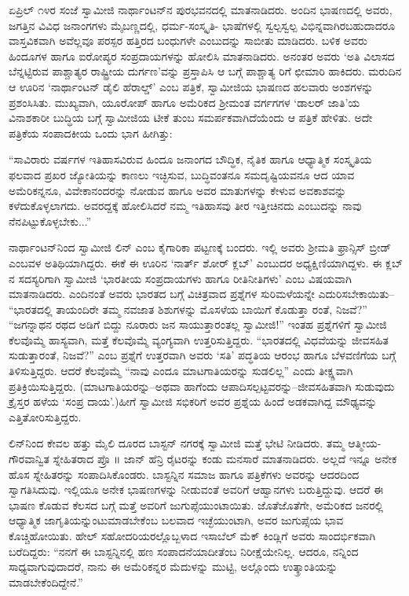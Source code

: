ಏಪ್ರಿಲ್ ೧೪ರ ಸಂಜೆ ಸ್ವಾಮೀಜಿ ನಾರ್ಥಾಂಟನ್​ನ ಪುರಭವನದಲ್ಲಿ ಮಾತನಾಡಿದರು. ಅಂದಿನ ಭಾಷಣದಲ್ಲಿ ಅವರು, ಜಗತ್ತಿನ ವಿವಿಧ ಜನಾಂಗಗಳು ಮೈಬಣ್ಣದಲ್ಲಿ, ಧರ್ಮ-ಸಂಸ್ಕೃತಿ- ಭಾಷೆಗಳಲ್ಲಿ ಸ್ವಲ್ಪಸ್ವಲ್ಪ ವಿಭಿನ್ನವಾಗಿರಬಹುದಾದರೂ ವಾಸ್ತವಿಕವಾಗಿ ಅವೆಲ್ಲವೂ ಪರಸ್ಪರ ಹತ್ತಿರದ ಬಂಧುಗಳೇ ಎಂಬುದನ್ನು ಸಾಬೀತು ಮಾಡಿದರು. ಬಳಿಕ ಅವರು ಹಿಂದೂಗಳ ಹಾಗೂ ಐರೋಪ್ಯರ ಸಂಪ್ರದಾಯಗಳನ್ನು ಹೋಲಿಸಿ ಮಾತನಾಡಿದರು. ಅನಂತರ ಅವರು ‘ಅತಿ ವಿಲಾಸದ ಬೆನ್ನಟ್ಟಿರುವ ಪಾಶ್ಚಾತ್ಯರ ರಾಷ್ಟ್ರೀಯ ದುರ್ಗಣ’ವನ್ನು ಪ್ರಸ್ತಾಪಿಸಿ ಆ ಬಗ್ಗೆ ಪಾಶ್ಚಾತ್ಯ ರಿಗೆ ಛೀಮಾರಿ ಹಾಕಿದರು. ಮರುದಿನ ಆ ಊರಿನ ‘ನಾರ್ಥಾಂಟನ್ ಡೈಲಿ ಹೆರಾಲ್ಡ್​’ ಎಂಬ ಪತ್ರಿಕೆ, ಸ್ವಾಮೀಜಿಯ ಭಾಷಣದ ಹಲವಾರು ಅಂಶಗಳನ್ನು ಪ್ರಶಂಸಿಸಿತು. ಮುಖ್ಯವಾಗಿ, ಯೂರೋಪ್ ಹಾಗೂ ಅಮೆರಿಕದ ಶ್ರೀಮಂತ ವರ್ಗಗಗಳ ‘ಡಾಲರ್ ಜಾತಿ’ಯ ವಿನಾಶಕಾರೀ ಬುದ್ಧಿಯ ಬಗ್ಗೆ ಸ್ವಾಮೀಜಿಯ ಟೀಕೆ ತುಂಬ ಸಮರ್ಪಕವಾಗಿದೆಯೆಂದು ಆ ಪತ್ರಿಕೆ ಹೇಳಿತು. ಅದೇ ಪತ್ರಿಕೆಯ ಸಂಪಾದಕೀಯ ಒಂದು ಭಾಗ ಹೀಗಿತ್ತು:

“ಸಾವಿರಾರು ವರ್ಷಗಳ ಇತಿಹಾಸವಿರುವ ಹಿಂದೂ ಜನಾಂಗದ ಬೌದ್ಧಿಕ, ನೈತಿಕ ಹಾಗೂ ಆಧ್ಯಾತ್ಮಿಕ ಸಂಸ್ಕೃತಿಯ ಫಲವಾದ ಪ್ರಖರ ಜ್ಯೋತಿಯನ್ನು ಕಾಣಲು ಇಚ್ಛಿಸುವ, ಬುದ್ಧಿವಂತನೂ ಸಮದೃಷ್ಟಿಯವನೂ ಆದ ಯಾವ ಅಮೆರಿಕನ್ನನೂ, ವಿವೇಕಾನಂದರನ್ನು ನೋಡುವ ಹಾಗೂ ಅವರ ಮಾತುಗಳನ್ನು ಕೇಳುವ ಅವಕಾಶವನ್ನು ಕಳೆದುಕೊಳ್ಳಲಾಗದು. ಅವರದ್ದಕ್ಕೆ ಹೋಲಿಸಿದರೆ ನಮ್ಮ ಇತಿಹಾಸವು ತೀರ ಇತ್ತೀಚಿನದು ಎಂಬುದನ್ನು ನಾವು ನೆನಪಿಟ್ಟುಕೊಳ್ಳಬೇಕು...”

ನಾರ್ಥಾಂಟನ್​ನಿಂದ ಸ್ವಾಮೀಜಿ ಲಿನ್ ಎಂಬ ಕೈಗಾರಿಕಾ ಪಟ್ಟಣಕ್ಕೆ ಬಂದರು. ಇಲ್ಲಿ ಅವರು ಶ್ರೀಮತಿ ಫ್ರಾನ್ಸಿಸ್ ಬ್ರೀಡ್ ಎಂಬವಳ ಅತಿಥಿಯಾಗಿದ್ದರು. ಈಕೆ ಈ ಊರಿನ ‘ನಾರ್ತ್ ಶೋರ್ ಕ್ಲಬ್​’ ಎಂಬುದರ ಅಧ್ಯಕ್ಷಿಣಿಯಾಗಿದ್ದಳು. ಈ ಕ್ಲಬ್​ನ ಸದಸ್ಯರಿಗಾಗಿ ಸ್ವಾಮೀಜಿ ‘ಭಾರತೀಯ ಸಂಪ್ರದಾಯಗಳು ಹಾಗೂ ರೀತಿನೀತಿಗಳು’ ಎಂಬ ವಿಷಯವಾಗಿ ಮಾತನಾಡಿದರು. ಎಂದಿನಂತೆ ಅವರು ಭಾರತದ ಬಗ್ಗೆ ವಿಚಿತ್ರವಾದ ಪ್ರಶ್ನೆಗಳ ಸುರಿಮಳೆಯನ್ನೇ ಎದುರಿಸಬೇಕಾಯಿತು– “ಭಾರತದಲ್ಲಿ ತಾಯಂದಿರೇ ತಮ್ಮ ನವಜಾತ ಶಿಶುಗಳನ್ನು ಮೊಸಳೆಯ ಬಾಯಿಗೆ ಕೊಡುತ್ತಾ ರಂತೆ, ನಿಜವೆ?” “ಜಗನ್ನಾಥನ ರಥದ ಅಡಿಗೆ ಬಿದ್ದು ನೂರಾರು ಜನ ಸಾಯುತ್ತಾರಂತಲ್ಲ ಸ್ವಾಮೀಜಿ!” ಇಂತಹ ಪ್ರಶ್ನೆಗಳಿಗೆ ಸ್ವಾಮೀಜಿ ಕೆಲವೊಮ್ಮೆ ಹಾಸ್ಯವಾಗಿ, ಮತ್ತೆ ಕೆಲವೊಮ್ಮೆ ವ್ಯಂಗ್ಯವಾಗಿ ಉತ್ತರಿಸುತ್ತಿದ್ದರು. “ಭಾರತದಲ್ಲಿ ವಿಧವೆಯನ್ನು ಜೀವಸಹಿತ ಸುಡುತ್ತಾರಂತೆ, ನಿಜವೆ?” ಎಂಬ ಪ್ರಶ್ನೆಗೆ ಉತ್ತರವಾಗಿ ಅವರು ‘ಸತಿ’ ಪದ್ಧತಿಯ ಆರಂಭ ಹಾಗೂ ಬೆಳವಣಿಗೆಯ ಬಗ್ಗೆ ತಿಳಿಸುತ್ತಿದ್ದರು. ಆದರೆ ಕೆಲವೊಮ್ಮೆ “ನಾವು ಎಂದೂ ಮಾಟಗಾತಿಯರನ್ನು ಸುಡಲಿಲ್ಲ” ಎಂದು ತೀಕ್ಷ್ಣವಾಗಿ ಪ್ರತಿಕ್ರಿಯಿಸುತ್ತಿದ್ದರು. (ಮಾಟಗಾತಿಯರನ್ನು–ಅಥವಾ ಹಾಗೆಂದು ಆಪಾದಿಸಲ್ಪಟ್ಟವರನ್ನು–ಜೀವಸಹಿತವಾಗಿ ಸುಡುವುದು ಕ್ರೈಸ್ತರ ಹಳೆಯ ‘ಸಂಪ್ರ ದಾಯ’.)ಹೀಗೆ ಸ್ವಾಮೀಜಿ ಸಭಿಕರಿಗೆ ಅವರ ಪ್ರಶ್ನೆಯ ಹಿಂದೆ ಅಡಕವಾಗಿದ್ದ ಮೌಢ್ಯವನ್ನು ಎತ್ತಿತೋರಿಸುತ್ತಿದ್ದರು.

ಲಿನ್​ನಿಂದ ಕೇವಲ ಹತ್ತು ಮೈಲಿ ದೂರದ ಬಾಸ್ಟನ್ ನಗರಕ್ಕೆ ಸ್ವಾಮೀಜಿ ಮತ್ತೆ ಭೇಟಿ ನೀಡಿದರು. ತಮ್ಮ ಆತ್ಮೀಯ-ಗೌರವಾನ್ವಿತ ಸ್ನೇಹಿತರಾದ ಪ್ರೊ ॥ ಜಾನ್ ಹೆನ್ರಿ ರೈಟರನ್ನು ಕಂಡು ಮನಸಾರೆ ಮಾತನಾಡಿದರು. ಅಲ್ಲದೆ ಇನ್ನೂ ಅನೇಕ ಹೊಸ ಸ್ನೇಹಿತರನ್ನು ಸಂಪಾದಿಸಿಕೊಂಡರು. ಬಾಸ್ಟನ್ನಿನ ಸಮಾಜ ಹಾಗೂ ಪತ್ರಿಕೆಗಳು ಅವರನ್ನು ಆದರದಿಂದ ಸ್ವಾಗತಿಸಿದುವು. ಇಲ್ಲಿಯೂ ಅನೇಕ ಭಾಷಣಗಳನ್ನು ನೀಡುವಂತೆ ಅವರಿಗೆ ಆಹ್ವಾನಗಳು ಬರುತ್ತಿದ್ದುವು. ಆದರೆ ಈ ಭಾಷಣ ಕೊಡುವ ಕೆಲಸದ ಬಗ್ಗೆ ಮತ್ತೆ ಅವರಿಗೆ ಜುಗುಪ್ಸೆಯುಂಟಾಯಿತು. ಜೊತೆಜೊತೆಗೇ, ಅಮೆರಿಕದ ಜನರಲ್ಲಿ ಆಧ್ಯಾತ್ಮಿಕ ಜಾಗೃತಿಯನ್ನುಂಟುಮಾಡಬೇಕೆಂಬ ಬಲವಾದ ಇಚ್ಛೆಯುಂಟಾಗಿ, ಅವರ ಜುಗುಪ್ಸೆಯ ಭಾವ ಕೊಚ್ಚಿಹೋಯಿತು. ಹೇಲ್ ಸಹೋದರಿಯರಲ್ಲೊಬ್ಬಳಾದ ಇಸಾಬೆಲ್ ಮೆಕ್ ಕಿಂಡ್ಲಿಗೆ ಅವರು ಸಾಂದರ್ಭಿಕವಾಗಿ ಬರೆದಿದ್ದರು: “ನನಗೆ ಈ ಬಾಸ್ಟನ್ನಿನಲ್ಲಿ ಹಣ ಸಂಪಾದನೆಯಾದೀತೆಂಬ ನಿರೀಕ್ಷೆಯೇನಿಲ್ಲ. ಆದರೂ, ನನ್ನಿಂದ ಸಾಧ್ಯವಾಗುವುದಾದರೆ, ನಾನು ಈ ಅಮೆರಿಕನ್ನರ ಮೆದುಳನ್ನು ಮುಟ್ಟಿ, ಅಲ್ಲೊಂದು ಉತ್ಕ್ರಾಂತಿಯನ್ನು ಮಾಡಬೇಕೆಂದಿದ್ದೇನೆ.”

